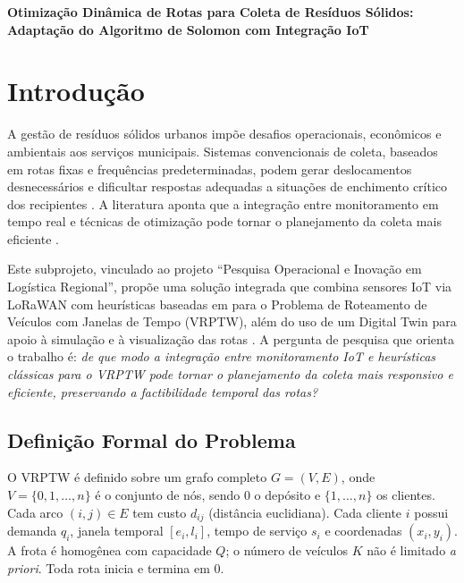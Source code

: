 \documentclass[10pt, a4paper]{article}
\begin{document}
\begin{center}
 {\Large \bf Otimiza\c{c}\~ao Din\^amica de Rotas para Coleta de Res\'iduos S\'olidos: Adapta\c{c}\~ao do Algoritmo de Solomon com Integra\c{c}\~ao IoT}
\end{center}

\vspace{.5cm}

\section{Introdu\c{c}\~ao}
\label{sec-intro}

A gest\~ao de res\'iduos s\'olidos urbanos imp\~oe desafios operacionais, econ\^omicos e ambientais aos servi\c{c}os municipais. Sistemas convencionais de coleta, baseados em rotas fixas e frequ\^encias predeterminadas, podem gerar deslocamentos desnecess\'arios e dificultar respostas adequadas a situa\c{c}\~oes de enchimento cr\'itico dos recipientes \citep{pardini2020, lozano2018}. A literatura aponta que a integra\c{c}\~ao entre monitoramento em tempo real e t\'ecnicas de otimiza\c{c}\~ao pode tornar o planejamento da coleta mais eficiente \citep{lozano2018, barth2023}.

Este subprojeto, vinculado ao projeto ``Pesquisa Operacional e Inova\c{c}\~ao em Log\'istica Regional'', prop\~oe uma solu\c{c}\~ao integrada que combina sensores IoT via LoRaWAN \citep{ramson2021, almeida2021} com heur\'isticas baseadas em \citet{solomon1987} para o Problema de Roteamento de Ve\'iculos com Janelas de Tempo (VRPTW), al\'em do uso de um Digital Twin para apoio \`a simula\c{c}\~ao e \`a visualiza\c{c}\~ao das rotas \citep{barth2023}. A pergunta de pesquisa que orienta o trabalho \'e: \textit{de que modo a integra\c{c}\~ao entre monitoramento IoT e heur\'isticas cl\'assicas para o VRPTW pode tornar o planejamento da coleta mais responsivo e eficiente, preservando a factibilidade temporal das rotas?}

\subsection{Defini\c{c}\~ao Formal do Problema}

O VRPTW \'e definido sobre um grafo completo $G = (V, E)$, onde $V = \{0, 1, \ldots, n\}$ \'e o conjunto de n\'os, sendo $0$ o dep\'osito e $\{1, \ldots, n\}$ os clientes. Cada arco $(i, j) \in E$ tem custo $d_{ij}$ (dist\^ancia euclidiana). Cada cliente $i$ possui demanda $q_i$, janela temporal $[e_i, l_i]$, tempo de servi\c{c}o $s_i$ e coordenadas $(x_i, y_i)$. A frota \'e homog\^enea com capacidade $Q$; o n\'umero de ve\'iculos $K$ n\~ao \'e limitado \textit{a priori}. Toda rota inicia e termina em $0$.
\end{document}
